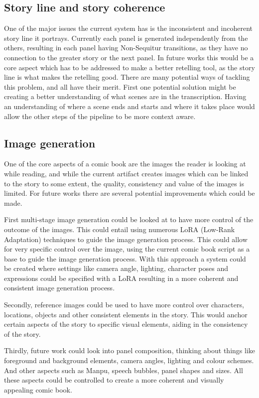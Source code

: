 \subsection*{Story line and story coherence}
One of the major issues the current system has is the inconsistent and incoherent story line it portrays. Currently each panel is generated independently from the others, resulting in each panel having Non-Sequitur transitions, as they have no connection to the greater story or the next panel. In future works this would be a core aspect which has to be addressed to make a better retelling tool, as the story line is what makes the retelling good. There are many potential ways of tackling this problem, and all have their merit. First one potential solution might be creating a better understanding of what scenes are in the transcription. Having an understanding of where a scene ends and starts and where it takes place would allow the other steps of the pipeline to be more context aware.

\subsection*{Image generation}
One of the core aspects of a comic book are the images the reader is looking at while reading, and while the current artifact creates images which can be linked to the story to some extent, the quality, consistency and value of the images is limited. For future works there are several potential improvements which could be made.

First multi-stage image generation could be looked at to have more control of the outcome of the images. This could entail using numerous LoRA (Low-Rank Adaptation) techniques to guide the image generation process. This could allow for very specific control over the image, using the current comic book script as a base to guide the image generation process. With this approach a system could be created where settings like camera angle, lighting, character poses and expressions could be specified with a LoRA resulting in a more coherent and consistent image generation process.

Secondly, reference images could be used to have more control over characters, locations, objects and other consistent elements in the story. This would anchor certain aspects of the story to specific visual elements, aiding in the consistency of the story.

Thirdly, future work could look into panel composition, thinking about things like foreground and background elements, camera angles, lighting and colour schemes. And other aspects such as Manpu, speech bubbles, panel shapes and sizes. All these aspects could be controlled to create a more coherent and visually appealing comic book.

